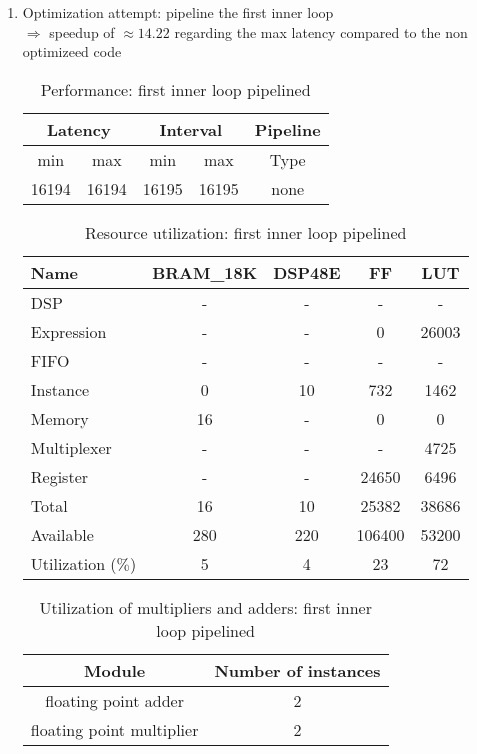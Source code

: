 \documentclass[../main.tex]{subfiles}
\begin{document}
\begin{enumerate}
	\item Optimization attempt: pipeline the first inner loop \\
		\label{attempt2}
		$\Rightarrow$ speedup of $\approx 14.22 $ regarding the max latency compared to the non optimizeed code
	\begin{table}[H]
		\centering
		\begin{tabular}{ccccc}
			\multicolumn{2}{c}{Latency} & \multicolumn{2}{c}{Interval} & Pipeline\\
			\hline
			min  &   max  &   min  &   max  &   Type  \\
			16194&  16194&  16195&  16195&   none  
		\end{tabular}
		\caption{Performance: first inner loop pipelined}
		\label{1-b-perf-table-2}
	\end{table}

	\begin{table}[H]
		\centering
		\begin{tabular}{lcccc}
			Name      & BRAM\_18K& DSP48E&   FF   &  LUT  \\
			\hline
			DSP              &        -&      -&       -&      -\\
			Expression       &        -&      -&       0&  26003\\
			FIFO             &        -&      -&       -&      -\\
			Instance         &        0&     10&     732&   1462\\
			Memory           &       16&      -&       0&      0\\
			Multiplexer      &        -&      -&       -&   4725\\
			Register         &        -&      -&   24650&   6496\\
			\hline
			Total            &       16&     10&   25382&  38686\\
			Available        &      280&    220&  106400&  53200\\
			\hline
			Utilization ($\%$)  &        5&      4&      23&     72
		\end{tabular}
		\caption{Resource utilization: first inner loop pipelined}
		\label{1-b-resources-2}
	\end{table}

	\begin{table}[H]
		\centering
		\begin{tabular}{cc}
			Module & Number of instances \\
			\hline
			floating point adder & 2 \\
			floating point multiplier & 2
		\end{tabular}
		\caption{Utilization of multipliers and adders: first inner loop pipelined}
		\label{1-b-resources-arithmetic-2}
	\end{table}


\end{enumerate}
\end{document}
